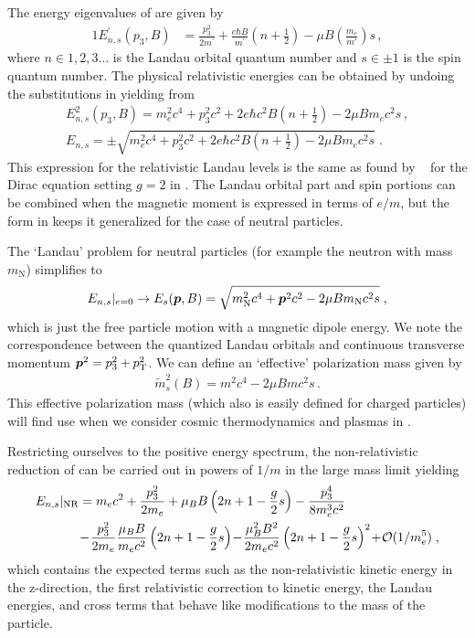 The energy eigenvalues of  are given by
\begin{alignat}{1}
    \label{lan23}
    E^\prime_{n,s}(p_{3},B)&=\frac{p_{3}^{2}}{2m^\prime }+\frac{e\hbar B}{m^\prime}\left(n+\frac{1}{2}\right)-\mu B\left(\frac{m_{e}}{m'}\right)s\,,
\end{alignat}
where $n\in1,2,3\ldots$ is the Landau orbital quantum number and $s\in\pm1$ is the spin quantum number. The physical relativistic energies can be obtained by undoing the substitutions in  yielding from 
\begin{gather}
\label{lan24}
E^{2}_{n,s}(p_{3},B)=m_{e}^{2}c^{4}+p_{3}^{2}c^{2}+2e\hbar c^{2}B\left(n+\frac{1}{2}\right)-2\mu B m_{e}c^{2}s\,,\\
\label{lan24b}
E_{n,s}=\pm\sqrt{m_{e}^{2}c^{4}+p_{3}^{2}c^{2}+2e\hbar c^{2}B\left(n+\frac{1}{2}\right)-2\mu B m_{e}c^{2}s}\;.
\end{gather}
This expression for the relativistic Landau levels is the same as found by ~\cite{Weisskopf:1936hya} for the Dirac equation setting $g\!=\!2$ in . The Landau orbital part and spin portions can be combined when the magnetic moment is expressed in terms of $e/m$, but the form in  keeps it generalized for the case of neutral particles.

The `Landau' problem for neutral particles (for example the neutron with mass $m_\mathrm{N}$) simplifies to
\begin{gather}
\label{neutral:1}
E_{n,s}|_{e=0}\rightarrow E_{s}(\boldsymbol{p},B)=\sqrt{m_\mathrm{N}^{2}c^{4}+\boldsymbol{p}^{2}c^{2}-2\mu B m_\mathrm{N}c^{2}s}\;,
\end{gather}
which is just the free particle motion with a magnetic dipole energy. We note the correspondence between the quantized Landau orbitals and continuous transverse momentum $\boldsymbol{p}^{2}=p_{3}^{2}+p_\mathrm{T}^{2}$. We can define an `effective' polarization mass given by
\begin{gather}
\label{neutral:2}
\boxed{\tilde{m}^{2}_{s}(B)=m^{2}c^{4}-2\mu B mc^{2}s}\,.
\end{gather}
This effective polarization mass (which also is easily defined for charged particles) will find use when we consider cosmic thermodynamics and plasmas in .

Restricting ourselves to the positive energy spectrum, the non-relativistic reduction of  can be carried out in powers of $1/m$ in the large mass limit yielding
\begin{alignat}{1}
\label{lan27} E_{n,s}|_\mathrm{NR}&=m_{e}c^{2}+\frac{p_{3}^{2}}{2m_{e}}+\mu_{B}B\left(2n+1-\frac{g}{2}s\right)-\frac{p_{3}^{4}}{8m_{e}^{3}c^{2}}\\ \notag &\!-\!\frac{p_{3}^{2}}{2m_{e}}\frac{\mu_{B}B}{m_{e}c^{2}}\left(2n+1-\frac{g}{2}s\right)\!-\!\frac{\mu_{B}^{2}B^{2}}{2m_{e}c^{2}}\left(2n+1-\frac{g}{2}s\right)^{2}\!+\!\mathcal{O}(1/m_{e}^{5})\;,\end{alignat}
which contains the expected terms such as the non-relativistic kinetic energy in the z-direction, the first relativistic correction to kinetic energy, the Landau energies, and cross terms that behave like modifications to the mass of the particle.

